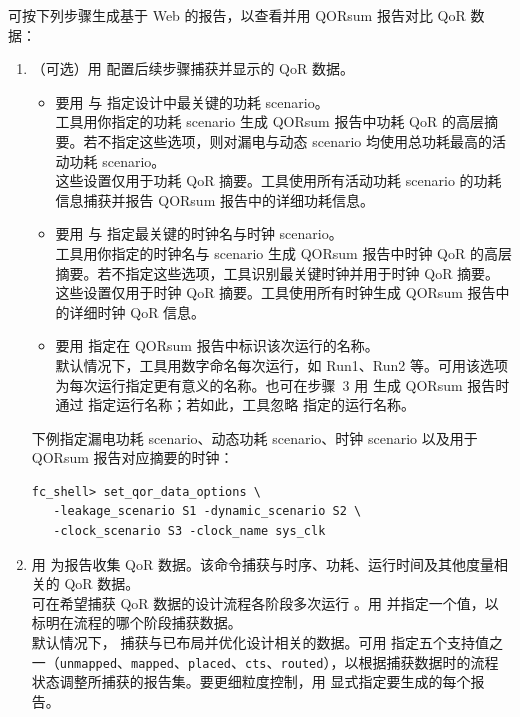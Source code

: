 可按下列步骤生成基于 Web 的报告，以查看并用 QORsum 报告对比 QoR 数据：
\begin{enumerate}
  \item （可选）用  配置后续步骤捕获并显示的 QoR 数据。
    \begin{itemize}
      \item 要用  与  指定设计中最关键的功耗 scenario。\\
        工具用你指定的功耗 scenario 生成 QORsum 报告中功耗 QoR 的高层摘要。若不指定这些选项，则对漏电与动态 scenario 均使用总功耗最高的活动功耗 scenario。\\
        这些设置仅用于功耗 QoR 摘要。工具使用所有活动功耗 scenario 的功耗信息捕获并报告 QORsum 报告中的详细功耗信息。
      \item 要用  与  指定最关键的时钟名与时钟 scenario。\\
        工具用你指定的时钟名与 scenario 生成 QORsum 报告中时钟 QoR 的高层摘要。若不指定这些选项，工具识别最关键时钟并用于时钟 QoR 摘要。\\
        这些设置仅用于时钟 QoR 摘要。工具使用所有时钟生成 QORsum 报告中的详细时钟 QoR 信息。
      \item 要用  指定在 QORsum 报告中标识该次运行的名称。\\
        默认情况下，工具用数字命名每次运行，如 Run1、Run2 等。可用该选项为每次运行指定更有意义的名称。也可在步骤~3 用  生成 QORsum 报告时通过  指定运行名称；若如此，工具忽略  指定的运行名称。
    \end{itemize}
    下例指定漏电功耗 scenario、动态功耗 scenario、时钟 scenario 以及用于 QORsum 报告对应摘要的时钟：
\begin{lstlisting}
fc_shell> set_qor_data_options \
   -leakage_scenario S1 -dynamic_scenario S2 \
   -clock_scenario S3 -clock_name sys_clk
\end{lstlisting}
  \item 用  为报告收集 QoR 数据。该命令捕获与时序、功耗、运行时间及其他度量相关的 QoR 数据。\\
    可在希望捕获 QoR 数据的设计流程各阶段多次运行 。用  并指定一个值，以标明在流程的哪个阶段捕获数据。\\
    默认情况下，\cmd{write\_qor\_data} 捕获与已布局并优化设计相关的数据。可用 \opt{-report\_group} 指定五个支持值之一（\texttt{unmapped}、\texttt{mapped}、\texttt{placed}、\texttt{cts}、\texttt{routed}），以根据捕获数据时的流程状态调整所捕获的报告集。要更细粒度控制，用  显式指定要生成的每个报告。\\

\end{enumerate}
